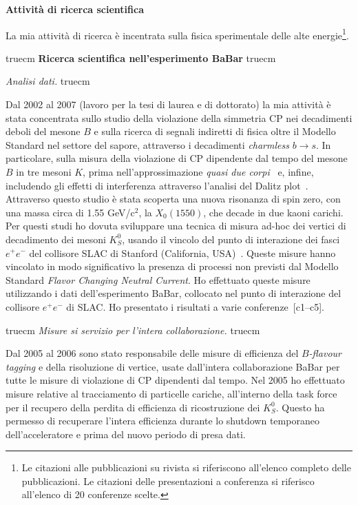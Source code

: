 \documentclass[11pt,twoside,a4paper]{article}
\begin{document}
\begin{center}
{\bf{Attivit\`a di ricerca scientifica}}
\end{center}

La mia attivit\`a di ricerca \`e incentrata sulla fisica sperimentale
delle alte energie\footnote{Le citazioni alle pubblicazioni su rivista
si riferiscono all'elenco completo delle pubblicazioni. Le citazioni
delle presentazioni a conferenza si riferisco all'elenco di 20
conferenze scelte.}.


 truecm
{\bf{Ricerca scientifica nell'esperimento BaBar}}
 truecm

\textit{Analisi dati.}
 truecm

Dal 2002 al 2007 (lavoro per la tesi di laurea e di dottorato) la mia
attivit\`a \`e stata concentrata sullo studio della violazione della
simmetria CP nei decadimenti deboli del mesone $B$ e sulla ricerca di
segnali indiretti di fisica oltre il Modello Standard nel settore del
sapore, attraverso i decadimenti \textit{charmless} $b \to s$. In
particolare, sulla misura della violazione di CP dipendente dal tempo
del mesone $B$ in tre mesoni $K$, prima nell'approssimazione
\textit{quasi due corpi}~\cite{Aubert:2008rr} e, infine, includendo
gli effetti di interferenza attraverso l'analisi del Dalitz
plot~\cite{Aubert:2007sd,Aubert:2007me}. Attraverso questo studio \`e
stata scoperta una nuova risonanza di spin zero, con una massa circa
di 1.55 GeV/c$^2$, la $X_0(1550)$, che decade in due kaoni
carichi. Per questi studi ho dovuta sviluppare una tecnica di misura
ad-hoc dei vertici di decadimento dei mesoni $K^0_S$, usando il
vincolo del punto di interazione dei fasci $e^+e^-$ del collisore SLAC
di Stanford (California, USA)~\cite{Aubert:2005dy,Aubert:2005gj}.
Queste misure hanno vincolato in modo significativo la presenza di
processi non previsti dal Modello Standard \textit{Flavor Changing
  Neutral Current}.  Ho effettuato queste misure utilizzando i dati
dell'esperimento BaBar, collocato nel punto di interazione del
collisore $e^+e^-$ di SLAC. Ho presentato i risultati a varie
conferenze~[c1--c5].

 truecm
\textit{Misure si servizio per l'intera collaborazione.}
 truecm

Dal 2005 al 2006 sono stato responsabile delle misure di efficienza
del \textit{$B$-flavour tagging} e della risoluzione di vertice, usate
dall'intera collaborazione BaBar per tutte le misure di violazione di
CP dipendenti dal tempo. Nel 2005 ho effettuato misure relative al
tracciamento di particelle cariche, all'interno della task force per
il recupero della perdita di efficienza di ricostruzione dei
$K^0_S$. Questo ha permesso di recuperare l'intera efficienza durante
lo shutdown temporaneo dell'acceleratore e prima del nuovo periodo di
presa dati.
\end{document}
